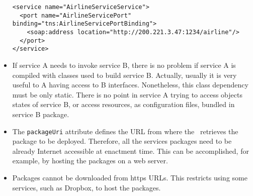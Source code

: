 \begin{itemize}
{\footnotesize
\begin{lstlisting}[caption=Good example of service port address on a WSDL file, 
label=lst:wsdl_address] 
<service name="AirlineServiceService">
  <port name="AirlineServicePort" binding="tns:AirlineServicePortBinding">
    <soap:address location="http://200.221.3.47:1234/airline"/>
  </port>
</service>
\end{lstlisting}
}

\item If service A needs to invoke service B, there is no problem if service A is compiled with classes used to build service B. Actually, usually it is very useful to A having access to B interfaces. Nonetheless, this class dependency must be only static. There is no point in service A trying to access objects states of service B, or access resources, as configuration files, bundled in service B package.

\item The \texttt{packageUri} attribute defines the URL from where the \ee\ retrieves the package to be deployed. Therefore, all the services packages need to be already Internet accessible at enactment time. This can be accomplished, for example, by hosting the packages on a web server.

\item Packages cannot be downloaded from https URLs. This restricts using some services, such as Dropbox, to host the packages.

\end{itemize}

